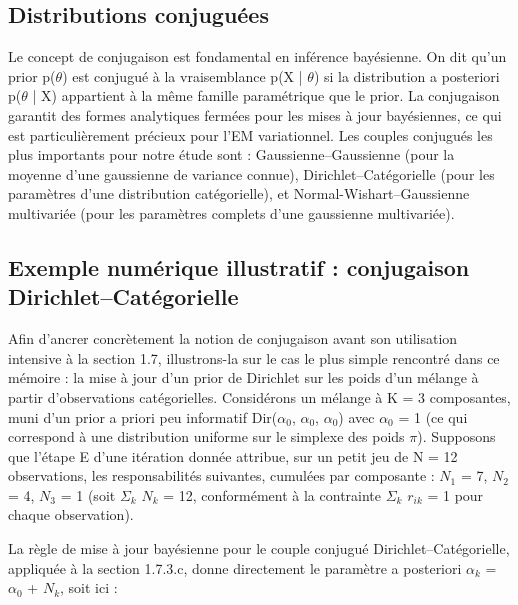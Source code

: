 \subsection{Distributions conjuguées}
Le concept de conjugaison est fondamental en inférence bayésienne. On dit qu'un prior p($\theta $) est conjugué à la vraisemblance p(X | $\theta $) si la distribution a posteriori p($\theta $ | X) appartient à la même famille paramétrique que le prior. La conjugaison garantit des formes analytiques fermées pour les mises à jour bayésiennes, ce qui est particulièrement précieux pour l'EM variationnel. Les couples conjugués les plus importants pour notre étude sont : Gaussienne--Gaussienne (pour la moyenne d'une gaussienne de variance connue), Dirichlet--Catégorielle (pour les paramètres d'une distribution catégorielle), et Normal-Wishart--Gaussienne multivariée (pour les paramètres complets d'une gaussienne multivariée).

\subsection{Exemple numérique illustratif : conjugaison Dirichlet--Catégorielle}
Afin d'ancrer concrètement la notion de conjugaison avant son utilisation intensive à la section 1.7, illustrons-la sur le cas le plus simple rencontré dans ce mémoire : la mise à jour d'un prior de Dirichlet sur les poids d'un mélange à partir d'observations catégorielles. Considérons un mélange à K = 3 composantes, muni d'un prior a priori peu informatif Dir($\alpha _{0}$, $\alpha _{0}$, $\alpha _{0}$) avec $\alpha _{0}$ = 1 (ce qui correspond à une distribution uniforme sur le simplexe des poids $\pi $). Supposons que l'étape E d'une itération donnée attribue, sur un petit jeu de N = 12 observations, les responsabilités suivantes, cumulées par composante : $N_{1}$ = 7, $N_{2}$ = 4, $N_{3}$ = 1 (soit $\Sigma _{k}$ $N_{k}$ = 12, conformément à la contrainte $\Sigma _{k}$ $r_{ik}$ = 1 pour chaque observation).

La règle de mise à jour bayésienne pour le couple conjugué Dirichlet--Catégorielle, appliquée à la section 1.7.3.c, donne directement le paramètre a posteriori $\alpha _{k}$ = $\alpha _{0}$ + $N_{k}$, soit ici :

